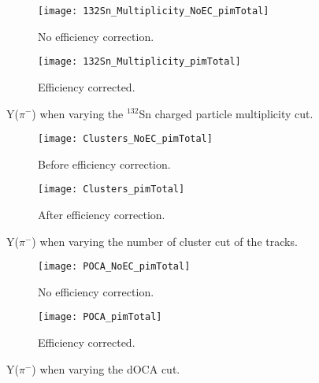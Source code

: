 \begin{figure}[!htb]
     \centering
     \begin{subfigure}[b]{\textwidth}
         \centering
         \texttt{[image: 132Sn\_Multiplicity\_NoEC\_pimTotal]}
         \caption{No efficiency correction.}
         \label{fig:pim_multCutVar_NoEC}
     \end{subfigure}
     \hfill
    \begin{subfigure}[b]{\textwidth}
         \centering
         \texttt{[image: 132Sn\_Multiplicity\_pimTotal]}
         \caption{Efficiency corrected.}
         \label{fig:pim_multCutVar}
     \end{subfigure}
     \hfill
\caption{Y($\pi^-$) when varying the ${}^{132}$Sn charged particle multiplicity cut. }
\label{fig:pim_multCutVar}
\end{figure}



\begin{figure}[!htb]
     \centering
     \begin{subfigure}[b]{\textwidth}
         \centering
         \texttt{[image: Clusters\_NoEC\_pimTotal]}
         \caption{Before efficiency correction.}
         \label{fig:pim_clustVar_NoEC}
     \end{subfigure}
     \hfill
    \begin{subfigure}[b]{\textwidth}
         \centering
         \texttt{[image: Clusters\_pimTotal]}
         \caption{After efficiency correction.}
         \label{fig:pim_clustVar_EC}
     \end{subfigure}
     \hfill
\caption{Y($\pi^-$) when varying the number of cluster cut of the tracks.}
\label{fig:pim_clustVar}
\end{figure}




\begin{figure}[!htb]
     \centering
     \begin{subfigure}[b]{\textwidth}
         \centering
         \texttt{[image: POCA\_NoEC\_pimTotal]}
         \caption{No efficiency correction.}
         \label{fig:pim_cutVarPOCA_NoEC}
     \end{subfigure}
     \hfill
    \begin{subfigure}[b]{\textwidth}
         \centering
         \texttt{[image: POCA\_pimTotal]}
         \caption{Efficiency corrected.}
         \label{fig:pim_cutVarPOCA_EC}
     \end{subfigure}
     \hfill
\caption{Y($\pi^-$) when varying the dOCA cut.}
\label{fig:pim_cutVarPOCA}
\end{figure}





